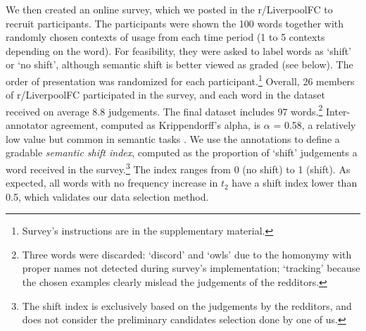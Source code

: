 We then created an online survey, which we posted
in the r/LiverpoolFC to recruit
participants.
The participants were shown the 100 words
together with randomly chosen contexts of usage from each time period (1 to 5
contexts depending on the word). For feasibility, they were asked to label words as `shift' or `no shift', although semantic shift is better viewed as graded (see below). The order of presentation was randomized for each participant.\footnote{Survey's instructions are in the supplementary material.}
Overall, 26 members of r/LiverpoolFC participated in the survey, and each word in the dataset received on average 8.8 judgements. The final dataset includes 97 words.\footnote{Three words were discarded: `discord'  and `owls' due to the homonymy with proper names not detected during survey's implementation; `tracking' because the chosen examples clearly mislead the judgements of the redditors.} Inter-annotator agreement, computed as Krippendorff's alpha, is $\alpha$ = 0.58, a relatively low value but common in semantic tasks \cite{artstein2008inter}.
We use the annotations to define a gradable \emph{semantic shift index}, computed as the proportion of `shift' judgements a word received in the survey.\footnote{The shift index is exclusively based on the judgements by the redditors, and does not consider the preliminary candidates selection done by one of us.} The index ranges from 0 (no shift) to 1 (shift). As expected, all words with no frequency increase in $t_2$ have a shift index lower than 0.5, which validates our data selection method.

